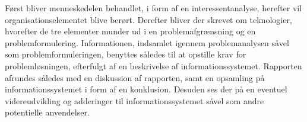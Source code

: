 Først bliver menneskedelen behandlet, i form af en interessentanalyse, herefter vil organisationselementet blive berørt.
Derefter bliver der skrevet om teknologier, hvorefter de tre elementer munder ud i en problemafgrænsning og en problemformulering.
Informationen, indsamlet igennem problemanalysen såvel som problemformuleringen, benyttes således til at opstille krav for problemløsningen, efterfulgt af en beskrivelse af informationssystemet. 
Rapporten afrundes således med en diskussion af rapporten, samt en opsamling på informationssystemet i form af en konklusion. Desuden ses der på en eventuel videreudvikling og adderinger til informationssystemet såvel som andre potentielle anvendelser.